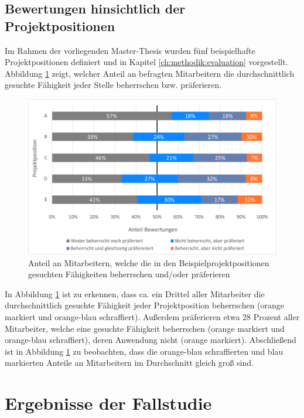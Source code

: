 \subsection{Bewertungen hinsichtlich der Projektpositionen}
\label{ch:ergebnisse:analyse:projektpositionen}
Im Rahmen der vorliegenden Master-Thesis wurden fünf beispielhafte Projektpositionen definiert und in Kapitel \ref{ch:methodik:evaluation} vorgestellt. Abbildung \ref{fig:ergebnisse:analyse:abb5} zeigt, welcher Anteil an befragten Mitarbeitern die durchschnittlich gesuchte Fähigkeit jeder Stelle beherrschen bzw. präferieren.

\begin{figure}[h]
	\centering
	\includegraphics[width=1\textwidth]{gfx/anteil-bewertungen-je-projektposition.png}
	\caption{Anteil an Mitarbeitern, welche die in den Beispielprojektpositionen gesuchten Fähigkeiten beherrschen und/oder präferieren}
	\label{fig:ergebnisse:analyse:abb5}
\end{figure}

In Abbildung \ref{fig:ergebnisse:analyse:abb5} ist zu erkennen, dass ca. ein Drittel aller Mitarbeiter die durchschnittlich gesuchte Fähigkeit jeder Projektposition beherrschen (orange markiert und orange-blau schraffiert). Außerdem präferieren etwa 28 Prozent aller Mitarbeiter, welche eine gesuchte Fähigkeit beherrschen (orange markiert und orange-blau schraffiert), deren Anwendung nicht (orange markiert). Abschließend ist in Abbildung \ref{fig:ergebnisse:analyse:abb5} zu beobachten, dass die orange-blau schraffierten und blau markierten Anteile an Mitarbeitern im Durchschnitt gleich groß sind.

\section{Ergebnisse der Fallstudie}
\label{ch:ergebnisse:fallstudie}

